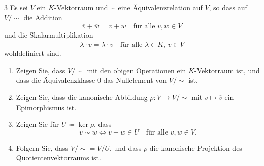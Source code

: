 \begin{question}[subtitle = Quotienten von Vektorräumen sind Quotientenvektorräume]{3}
  Es sei $V$ ein $K$-Vektorraum und $\sim$ eine Äquivalenzrelation auf $V$, so dass auf $V/{\sim}$ die Addition
  \[
      \overline{v} + \overline{w}
    = \overline{v + w}
    \quad
    \text{für alle $v, w \in V$}
  \]
  und die Skalarmultiplikation
  \[
      \lambda \cdot \overline{v}
    = \overline{\lambda \cdot v}
    \quad
    \text{für alle $\lambda \in K$, $v \in V$}
  \]
  wohldefiniert sind.
  \begin{enumerate}[leftmargin=*]
    \item
      Zeigen Sie, dass $V\!/{\sim}$ mit den obigen Operationen ein $K$-Vektorraum ist, und dass die Äquivalenzklasse $\overline{0}$ das Nullelement von $V/{\sim}$ ist.
    \item
      Zeigen Sie, dass die kanonische Abbildung $\rho \colon V \to V/{\sim}$ mit $v \mapsto \overline{v}$ ein Epimorphismus ist.
    \item
      Zeigen Sie für $U \coloneqq \ker \rho$, dass
      \[
        v \sim w
        \iff
        v - w \in U
        \quad
        \text{für alle $v, w \in V$}.
      \]
    \item
      Folgern Sie, dass $V\!/{\sim} = V\!/U$, und dass $\rho$ die kanonische Projektion des Quotientenvektorraums ist.
  \end{enumerate}
\end{question}


